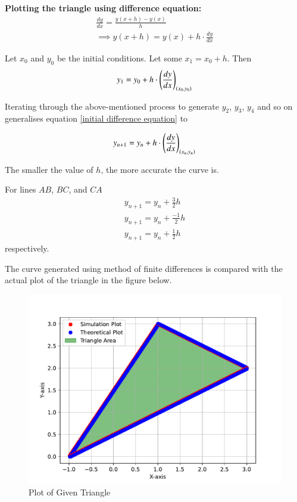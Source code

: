\documentclass[journal]{IEEEtran}
\begin{document}
\textbf{Plotting the triangle using difference equation:} \\
\begin{align}
\frac{dy}{dx} = \frac{y(x+h) - y(x)}{h} \\
\implies y(x+h) = y(x) + h\cdot\frac{dy}{dx} \label{difference equation in terms of y}
\end{align}

Let $x_0$ and $y_0$ be the initial conditions. Let some $x_1 = x_0 + h$. Then
\begin{align}
y_1 = y_0 + h\cdot\left(\frac{dy}{dx}\right)_{\left(x_0,y_0\right)} \label{initial difference equation}
\end{align}

Iterating through the above-mentioned process to generate $y_2$, $y_3$, $y_4$ and so on generalises equation \eqref{initial difference equation} to

\begin{align}
y_{n+1} = y_n + h\cdot\left(\frac{dy}{dx}\right)_{\left(x_n,y_n\right)}
\end{align}

The smaller the value of $h$, the more accurate the curve is.

For lines $AB$, $BC$, and $CA$
\begin{align}
y_{n+1} = y_n + \frac{3}{2}h \\
y_{n+1} = y_n + \frac{-1}{2}h \\
y_{n+1} = y_n + \frac{1}{2}h 
\end{align}
respectively. 

\newpage

The curve generated using method of finite differences is compared with the actual plot of the triangle in the figure below.

\begin{figure}[h]
	\centering
	\includegraphics[width=\columnwidth]{figs/triangle.pdf}
	\caption{Plot of Given Triangle}
	\label{fig2}
\end{figure}
\end{document}
